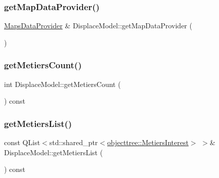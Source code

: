 \mbox{\label{class_displace_model_a5cc5b78119476b37fecea821a50ccae6}} 
\subsubsection{\texorpdfstring{getMapDataProvider()}{getMapDataProvider()}}
{\footnotesize\ttfamily \mbox{\hyperlink{class_maps_data_provider}{Maps\+Data\+Provider}} \& Displace\+Model\+::get\+Map\+Data\+Provider (\begin{DoxyParamCaption}{ }\end{DoxyParamCaption})}

\mbox{\label{class_displace_model_abcdffaf5e06dcc5402f42931942eb2c5}} 
\subsubsection{\texorpdfstring{getMetiersCount()}{getMetiersCount()}}
{\footnotesize\ttfamily int Displace\+Model\+::get\+Metiers\+Count (\begin{DoxyParamCaption}{ }\end{DoxyParamCaption}) const\hspace{0.3cm}{\ttfamily [inline]}}

\mbox{\label{class_displace_model_a94f3df2e0af6987830e254cca0a9804c}} 
\subsubsection{\texorpdfstring{getMetiersList()}{getMetiersList()}}
{\footnotesize\ttfamily const Q\+List$<$std\+::shared\+\_\+ptr$<$\mbox{\hyperlink{classobjecttree_1_1_metiers_interest}{objecttree\+::\+Metiers\+Interest}}$>$ $>$\& Displace\+Model\+::get\+Metiers\+List (\begin{DoxyParamCaption}{ }\end{DoxyParamCaption}) const\hspace{0.3cm}{\ttfamily [inline]}}

